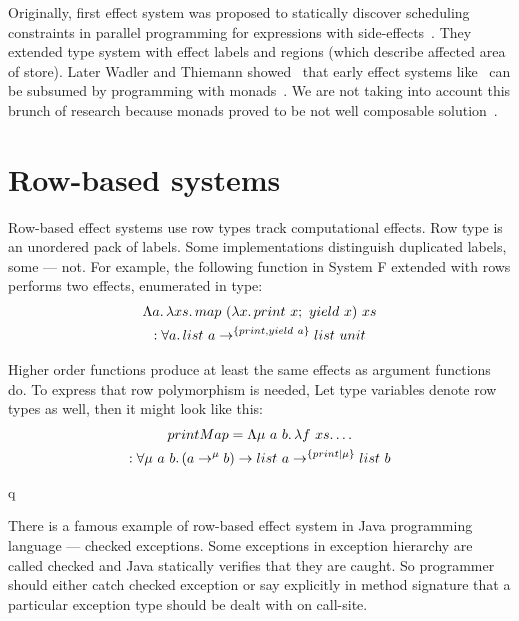 \documentclass[conference]{IEEEtran}
\newcommand{\seq}{;~}
\newcommand{\ap}{~}
\begin{document}
    Originally, first effect system was proposed to statically discover scheduling constraints in parallel programming for expressions with side-effects~\cite{first-effect-system}.
    They extended type system with effect labels and regions (which describe affected area of store).
    Later Wadler and Thiemann showed~\cite{marriage} that early effect systems like~\cite{first-effect-system} can be subsumed by programming with monads~\cite{monads}.
    We are not taking into account this brunch of research because monads proved to be not well composable solution~\cite{transformers, extensible-effects}.







    \section{Row-based systems}

    Row-based effect systems use row types track computational effects.
    Row type is an unordered pack of labels.
    Some implementations distinguish duplicated labels, some --- not.
    For example, the following function in System F extended with rows performs two effects, enumerated in type:
    \begin{multline*}
        \Lambda a\ldotp\lambda xs\ldotp map \ap (\lambda x\ldotp print\ap x\seq yield\ap x) \ap xs \\ : \forall a \ldotp list\ap a \to^{\{print, yield \ap a\}} list \ap unit
    \end{multline*}

    Higher order functions produce at least the same effects as argument functions do.
    To express that row polymorphism is needed,
    Let type variables denote row types as well, then it might look like this:
    \begin{multline*}
        printMap = \Lambda \mu \ap a \ap b\ldotp \lambda f\ap xs\ldotp \ldots \\ : \forall \mu \ap a \ap b\ldotp (a \to^\mu b) \to list \ap a \to^{\{print|\mu\}} list \ap b
    \end{multline*}

    q\cite{koka}\cite{links}

    There is a famous example of row-based effect system in Java programming language --- checked exceptions.
    Some exceptions in exception hierarchy are called checked and Java statically verifies that they are caught.
    So programmer should either catch checked exception or say explicitly in method signature that a particular exception type should be dealt with on call-site.
\end{document}
